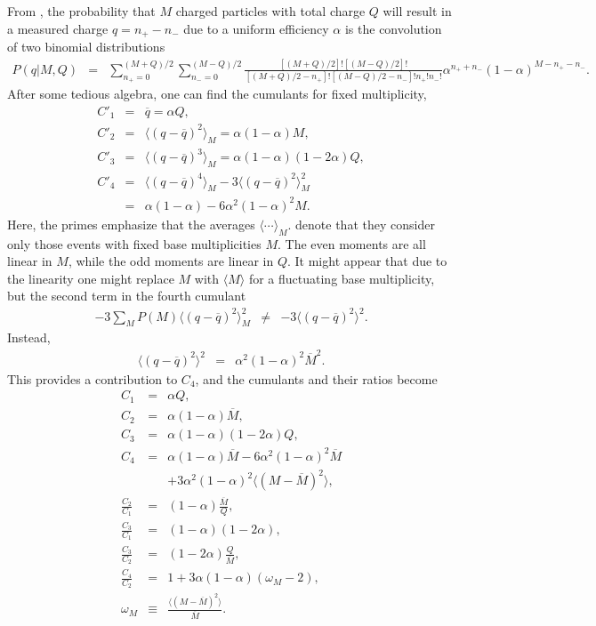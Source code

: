 From \cite{Savchuk:2019xfg}, the probability that $M$ charged particles with total charge $Q$ will result in a measured charge $q=n_+ - n_-$ due to a uniform efficiency $\alpha$ is the convolution of two binomial distributions
\begin{eqnarray}
P(q|M,Q)&=&\sum_{n_+=0}^{(M+Q)/2}\sum_{n_-=0}^{(M-Q)/2}\frac{[(M+Q)/2]![(M-Q)/2]!}{[(M+Q)/2-n_+]![(M-Q)/2-n_-]!n_+!n_-!}
\alpha^{n_++n_-}(1-\alpha)^{M-n_+-n_-}.
\end{eqnarray}
After some tedious algebra, one can find the cumulants for fixed multiplicity,
\begin{eqnarray}
C'_1&=&\overline{q}=\alpha Q,\\
\nonumber
C'_2&=&\langle (q-\overline{q})^2\rangle_M = \alpha(1-\alpha)M,\\
\nonumber
C'_3&=&\langle (q-\overline{q})^3\rangle_M = \alpha(1-\alpha)(1-2\alpha)Q,\\
\nonumber
C'_4&=&\langle(q-\overline{q})^4\rangle_M -3\langle(q-\overline{q})^2\rangle_M^2\\
\nonumber
&=&\alpha(1-\alpha)-6\alpha^2(1-\alpha)^2M.
\end{eqnarray}
Here, the primes emphasize that the averages $\langle\cdots\rangle_M$. denote that they consider only those events with fixed base multiplicities $M$. The even moments are all linear in $M$, while the odd moments are linear in $Q$. It might appear that due to the linearity one might replace $M$ with $\langle M\rangle$ for a fluctuating base multiplicity, but the second term in the fourth cumulant
\begin{eqnarray}
-3\sum_M P(M) \langle(q-\overline{q})^2\rangle_M^2 &\ne&
-3\langle(q-\overline{q})^2\rangle^2.
\end{eqnarray}
Instead,
\begin{eqnarray}
\langle(q-\overline{q})^2\rangle^2&=&\alpha^2(1-\alpha)^2\overline{M}^2.
\end{eqnarray}
This provides a contribution to $C_4$, and the cumulants and their ratios become \cite{Savchuk:2019xfg}
\begin{eqnarray}
\label{eq:savchuk}
C_1&=&\alpha Q,\\
\nonumber
C_2&=&\alpha(1-\alpha)\overline{M},\\
\nonumber
C_3&=&\alpha(1-\alpha)(1-2\alpha)Q,\\
\nonumber
C_4&=&\alpha(1-\alpha)\overline{M}-6\alpha^2(1-\alpha)^2\overline{M}\\
\nonumber
&&+3 \alpha^2 (1-\alpha)^2\langle(M-\overline{M})^2\rangle,\\
\nonumber
\frac{C_2}{C_1}&=&(1-\alpha)\frac{\overline{M}}{Q},\\
\nonumber
\frac{C_3}{C_1}&=&(1-\alpha)(1-2\alpha),\\
\nonumber
\frac{C_3}{C_2}&=&(1-2\alpha)\frac{Q}{\overline{M}},\\
\nonumber
\frac{C_4}{C_2}&=&1+3\alpha(1-\alpha)(\omega_M-2),\\
\nonumber
\omega_M&\equiv&\frac{\langle(M-\overline{M})^2\rangle}{\overline{M}}.
\end{eqnarray}
